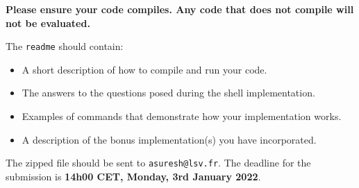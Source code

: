 \documentclass[11pt]{article}
\begin{document}
\textbf{Please ensure your code compiles. Any code that does not compile will not be evaluated.} 

The \texttt{readme} should contain: \begin{itemize}
	\item A short description of how to compile and run your code.
	\item The answers to the questions posed during the shell implementation.
	\item Examples of commands that demonstrate how your implementation works.
	\item A description of the bonus implementation(s) you have incorporated.
\end{itemize}

The zipped file should be sent to \texttt{asuresh@lsv.fr}. The deadline for the submission is \textbf{14h00 CET, Monday, 3rd January 2022}.
\end{document}
